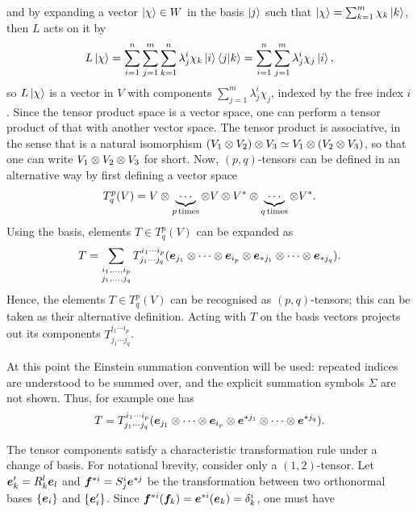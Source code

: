 and by expanding a vector $\ket{\chi} \in W$ in the basis $\ket{j}$ such that $\ket{\chi} = \sum_{k=1}^m\chi_k\ket{k}$, then $L$ acts on it by 
\begin{equation}
    L\ket{\chi} = \sum_{i=1}^n\sum_{j=1}^m\sum_{k=1}^n\lambda^i_j\chi_k\ket{i}\langle j | k \rangle = \sum_{i=1}^n\sum_{j=1}^m\lambda^i_j\chi_j\ket{i},
\end{equation}
so $L\ket{\chi}$ is a vector in $V$ with components $\sum_{j=1}^m\lambda^i_j\chi_j$, indexed by the free index $i$. Since the tensor product space is a vector space, one can perform a tensor product of that with another vector space. The tensor product is associative, in the sense that is a natural isomorphism $(V_1 \otimes V_2) \otimes V_3 \simeq V_1 \otimes (V_2 \otimes V_3)$, so that one can write $V_1 \otimes V_2 \otimes V_3$ for short. Now, $(p,q)$-tensors can be defined in an alternative way by first defining a vector space
\begin{equation}
    T^p_q(V) = V \otimes \underbrace{\cdots}_{p\,\mathrm{times}} \otimes V \otimes V^* \otimes \underbrace{\cdots}_{q\,\mathrm{times}} \otimes V^*.
\end{equation}
Using the basis, elements $T \in T^p_q(V)$ can be expanded as
\begin{equation}
    T = \sum_{\substack{i_1,\dots,i_p \\ j_1,\dots,j_q}}T^{i_1\cdots i_p}_{j_1\cdots j_q}(\bm{e}_{j_1} \otimes \cdots \otimes \bm{e}_{i_p} \otimes \bm{e}_{*j_1} \otimes \cdots \otimes \bm{e}_{*j_q}).
\end{equation}
Hence, the elements $T \in T^p_q(V)$ can be recognised as $(p,q)$-tensors; this can be taken as their alternative definition. Acting with $T$ on the basis vectors projects out its components $T^{i_1\cdots i_p}_{j_1\cdots j_q}$. 
\begin{notz}
    At this point the Einstein summation convention will be used: repeated indices are understood to be summed over, and the explicit summation symbols $\Sigma$ are not shown. Thus, for example one has
    \begin{equation}
        T = T^{i_1\cdots i_p}_{j_1\cdots j_q}(\bm{e}_{j_1} \otimes \cdots \otimes \bm{e}_{i_p} \otimes \bm{e}^{*j_1} \otimes \cdots \otimes \bm{e}^{*j_q}).
    \end{equation}
\end{notz}
The tensor components satisfy a characteristic transformation rule under a change of basis. For notational brevity, consider only a $(1,2)$-tensor. Let $\bm{e}_k' = R_k^l\bm{e}_l$ and $\bm{f}^{*i} = S^i_j\bm{e}^{*j}$ be the transformation between two orthonormal bases $\{\bm{e}_i\}$ and $\{\bm{e}_i'\}$. Since $\bm{f}^{*i}(\bm{f}_k) = \bm{e}^{*i}(\bm{e}_k) = \delta^i_k$, one must have
